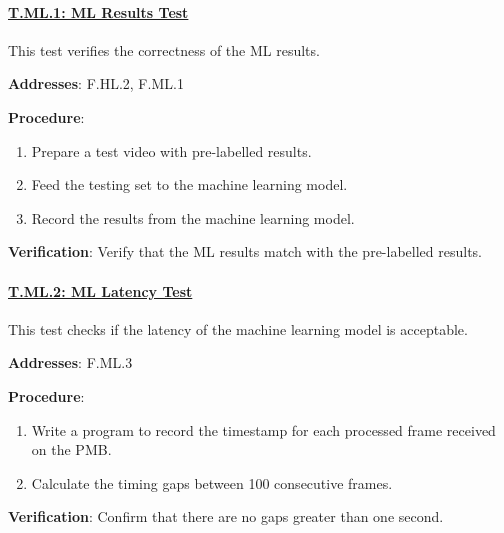 \paragraph{\underline{T.ML.1: ML Results Test}}

This test verifies the correctness of the ML results.

\textbf{Addresses}: F.HL.2, F.ML.1

\textbf{Procedure}:
\begin{enumerate}[noitemsep]
    \item Prepare a test video with pre-labelled results.
    \item Feed the testing set to the machine learning model.
    \item Record the results from the machine learning model.
\end{enumerate}

\textbf{Verification}: 
Verify that the ML results match with the pre-labelled results.

%

\paragraph{\underline{T.ML.2: ML Latency Test}}

This test checks if the latency of the machine learning model is acceptable.

\textbf{Addresses}: F.ML.3

\textbf{Procedure}:
\begin{enumerate}[noitemsep]
    \item Write a program to record the timestamp for each processed frame received on the PMB.
    \item Calculate the timing gaps between 100 consecutive frames.
\end{enumerate}

\textbf{Verification}: 
Confirm that there are no gaps greater than one second.